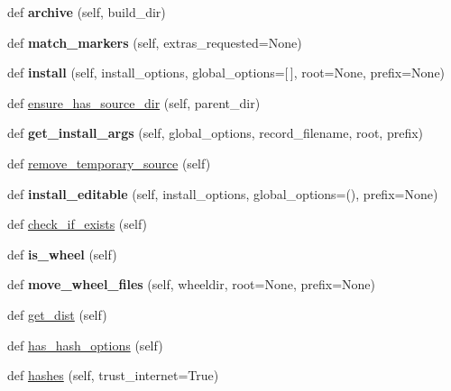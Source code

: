 \begin{DoxyCompactItemize}
def {\bfseries archive} (self, build\+\_\+dir)
\item 
\mbox{\label{classpip_1_1req_1_1req__install_1_1_install_requirement_a5d92c67c28eb9441f1b63edc6068bd4b}} 
def {\bfseries match\+\_\+markers} (self, extras\+\_\+requested=None)
\item 
\mbox{\label{classpip_1_1req_1_1req__install_1_1_install_requirement_a600c863cd223b45f735dbcf569a40b8d}} 
def {\bfseries install} (self, install\+\_\+options, global\+\_\+options=\mbox{[}$\,$\mbox{]}, root=None, prefix=None)
\item 
def \hyperlink{classpip_1_1req_1_1req__install_1_1_install_requirement_a6ff5e1d477f3b0701c3e8d7fe808c320}{ensure\+\_\+has\+\_\+source\+\_\+dir} (self, parent\+\_\+dir)
\item 
\mbox{\label{classpip_1_1req_1_1req__install_1_1_install_requirement_a929651005d30d015c883dea7b440a6b5}} 
def {\bfseries get\+\_\+install\+\_\+args} (self, global\+\_\+options, record\+\_\+filename, root, prefix)
\item 
def \hyperlink{classpip_1_1req_1_1req__install_1_1_install_requirement_a87bc6c4e5dcd1b8d6eb13e9eac6d7a88}{remove\+\_\+temporary\+\_\+source} (self)
\item 
\mbox{\label{classpip_1_1req_1_1req__install_1_1_install_requirement_a6298ddabea4db7f6f4d017f2dc692f4d}} 
def {\bfseries install\+\_\+editable} (self, install\+\_\+options, global\+\_\+options=(), prefix=None)
\item 
def \hyperlink{classpip_1_1req_1_1req__install_1_1_install_requirement_a659ce6ae6fcf099c3db81e536ed62334}{check\+\_\+if\+\_\+exists} (self)
\item 
\mbox{\label{classpip_1_1req_1_1req__install_1_1_install_requirement_a45e1e6ee63d049103ead51c6a618fead}} 
def {\bfseries is\+\_\+wheel} (self)
\item 
\mbox{\label{classpip_1_1req_1_1req__install_1_1_install_requirement_af19fff228c02b0b982a9d2cd8082ed4a}} 
def {\bfseries move\+\_\+wheel\+\_\+files} (self, wheeldir, root=None, prefix=None)
\item 
def \hyperlink{classpip_1_1req_1_1req__install_1_1_install_requirement_a9c214581cf5d5085b433d692b0ba9c2b}{get\+\_\+dist} (self)
\item 
def \hyperlink{classpip_1_1req_1_1req__install_1_1_install_requirement_a0ee852d57dff6bef1ef518d93906490b}{has\+\_\+hash\+\_\+options} (self)
\item 
def \hyperlink{classpip_1_1req_1_1req__install_1_1_install_requirement_a33e3b906ae6bf8954c90b79beb53efc0}{hashes} (self, trust\+\_\+internet=True)
\end{DoxyCompactItemize}
